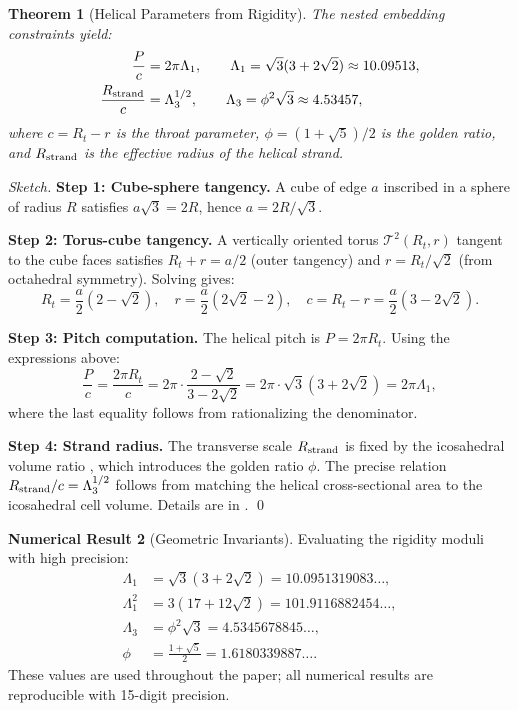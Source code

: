 \documentclass[12pt, a4paper]{article}
\newtheorem{theorem}{Theorem}[section]
\theoremstyle{definition}
\newtheorem{numericalresult}[theorem]{Numerical Result}
\newcommand{\cT}{\mathcal{T}}
\begin{document}
\begin{theorem}[Helical Parameters from Rigidity]
\label{thm:rigidity}
The nested embedding constraints yield:
\begin{align}
\frac{P}{c} &= 2\pi \Lambda_1, \qquad \Lambda_1 = \sqrt{3}(3+2\sqrt{2}) \approx 10.09513, \label{eq:Lambda1-def} \\
\frac{R_{\rm strand}}{c} &= \Lambda_3^{1/2}, \qquad \Lambda_3 = \phi^2\sqrt{3} \approx 4.53457, \label{eq:Lambda3-def}
\end{align}
where $c = R_t - r$ is the throat parameter, $\phi = (1+\sqrt{5})/2$ is the golden ratio, and $R_{\rm strand}$ is the effective radius of the helical strand.
\end{theorem}

\begin{proof}[Sketch]
\textbf{Step 1: Cube-sphere tangency.} A cube of edge $a$ inscribed in a sphere of radius $R$ satisfies $a\sqrt{3} = 2R$, hence $a = 2R/\sqrt{3}$.

\textbf{Step 2: Torus-cube tangency.} A vertically oriented torus $\cT^2(R_t,r)$ tangent to the cube faces satisfies $R_t + r = a/2$ (outer tangency) and $r = R_t/\sqrt{2}$ (from octahedral symmetry). Solving gives:
\begin{equation}
R_t = \frac{a}{2}(2-\sqrt{2}), \quad r = \frac{a}{2}(2\sqrt{2}-2), \quad c = R_t - r = \frac{a}{2}(3-2\sqrt{2}).
\end{equation}

\textbf{Step 3: Pitch computation.} The helical pitch is $P = 2\pi R_t$. Using the expressions above:
\begin{equation}
\frac{P}{c} = \frac{2\pi R_t}{c} = 2\pi \cdot \frac{2-\sqrt{2}}{3-2\sqrt{2}} = 2\pi \cdot \sqrt{3}(3+2\sqrt{2}) = 2\pi\Lambda_1,
\end{equation}
where the last equality follows from rationalizing the denominator.

\textbf{Step 4: Strand radius.} The transverse scale $R_{\rm strand}$ is fixed by the icosahedral volume ratio \cite{coxeter}, which introduces the golden ratio $\phi$. The precise relation $R_{\rm strand}/c = \Lambda_3^{1/2}$ follows from matching the helical cross-sectional area to the icosahedral cell volume. Details are in . \qed
\end{proof}

\begin{numericalresult}[Geometric Invariants]
Evaluating the rigidity moduli with high precision:
\begin{align}
\Lambda_1 &= \sqrt{3}(3+2\sqrt{2}) = 10.0951319083\ldots, \\
\Lambda_1^2 &= 3(17+12\sqrt{2}) = 101.9116882454\ldots, \\
\Lambda_3 &= \phi^2\sqrt{3} = 4.5345678845\ldots, \\
\phi &= \frac{1+\sqrt{5}}{2} = 1.6180339887\ldots.
\end{align}
These values are used throughout the paper; all numerical results are reproducible with 15-digit precision.
\end{numericalresult}
\end{document}
